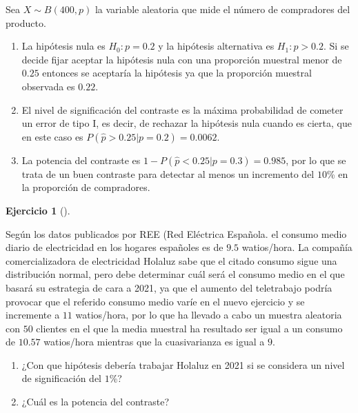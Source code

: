 \documentclass[
  a4paper,
]{scrreport}
\theoremstyle{definition}
\newtheorem{exercise}{Ejercicio}[chapter]
\theoremstyle{remark}
\begin{document}
\begin{tcolorbox}[enhanced jigsaw, colbacktitle=quarto-callout-tip-color!10!white, bottomrule=.15mm, bottomtitle=1mm, rightrule=.15mm, colback=white, left=2mm, opacityback=0, title=\textcolor{quarto-callout-tip-color}{\faLightbulb}\hspace{0.5em}{Solución}, leftrule=.75mm, arc=.35mm, titlerule=0mm, coltitle=black, opacitybacktitle=0.6, colframe=quarto-callout-tip-color-frame, breakable, toprule=.15mm, toptitle=1mm]

Sea \(X\sim B(400,p)\) la variable aleatoria que mide el número de
compradores del producto.

\begin{enumerate}
\def\labelenumi{\alph{enumi}.}
\item
  La hipótesis nula es \(H_0: p=0.2\) y la hipótesis alternativa es
  \(H_1: p> 0.2\). Si se decide fijar aceptar la hipótesis nula con una
  proporción muestral menor de \(0.25\) entonces se aceptaría la
  hipótesis ya que la proporción muestral observada es \(0.22\).
\item
  El nivel de significación del contraste es la máxima probabilidad de
  cometer un error de tipo I, es decir, de rechazar la hipótesis nula
  cuando es cierta, que en este caso es
  \(P(\hat p>0.25|p=0.2) = 0.0062\).
\item
  La potencia del contraste es \(1-P(\hat p<0.25|p=0.3) = 0.985\), por
  lo que se trata de un buen contraste para detectar al menos un
  incremento del \(10\)\% en la proporción de compradores.
\end{enumerate}

\end{tcolorbox}

\begin{exercise}[]\protect\hypertarget{exr-contraste-media-consumo-electrico}{}\label{exr-contraste-media-consumo-electrico}

Según los datos publicados por REE (Red Eléctrica Española. el consumo
medio diario de electricidad en los hogares españoles es de \(9.5\)
watios/hora. La compañía comercializadora de electricidad Holaluz sabe
que el citado consumo sigue una distribución normal, pero debe
determinar cuál será el consumo medio en el que basará su estrategia de
cara a 2021, ya que el aumento del teletrabajo podría provocar que el
referido consumo medio varíe en el nuevo ejercicio y se incremente a
\(11\) watios/hora, por lo que ha llevado a cabo un muestra aleatoria
con \(50\) clientes en el que la media muestral ha resultado ser igual a
un consumo de \(10.57\) watios/hora mientras que la cuasivarianza es
igual a \(9\).

\begin{enumerate}
\def\labelenumi{\alph{enumi}.}
\item
  ¿Con que hipótesis debería trabajar Holaluz en 2021 si se considera un
  nivel de significación del \(1\)\%?
\item
  ¿Cuál es la potencia del contraste?
\end{enumerate}

\end{exercise}
\end{document}
